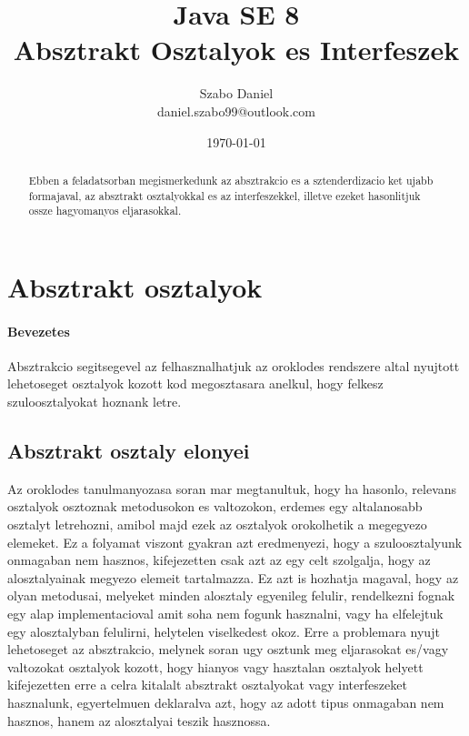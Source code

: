 \documentclass{article}
\title{%
Java SE 8 \\
\large Absztrakt Osztalyok es Interfeszek}
\author{Szabo Daniel\\daniel.szabo99@outlook.com}
\date{\today}
\begin{document}
\maketitle
\begin{abstract}
Ebben a feladatsorban megismerkedunk az absztrakcio es a sztenderdizacio ket ujabb formajaval, az absztrakt osztalyokkal es az interfeszekkel, illetve ezeket hasonlitjuk ossze hagyomanyos eljarasokkal.
\end{abstract}

\newpage

\tableofcontents{}

\newpage

\section{Absztrakt osztalyok}
\paragraph{Bevezetes}

Absztrakcio segitsegevel az felhasznalhatjuk az oroklodes rendszere altal nyujtott lehetoseget osztalyok kozott kod megosztasara anelkul, hogy felkesz szuloosztalyokat hoznank letre.

\subsection{Absztrakt osztaly elonyei}
Az oroklodes tanulmanyozasa soran mar megtanultuk, hogy ha hasonlo, relevans osztalyok osztoznak metodusokon es valtozokon, erdemes egy altalanosabb osztalyt letrehozni, amibol majd ezek az osztalyok orokolhetik a megegyezo elemeket. Ez a folyamat viszont gyakran azt eredmenyezi, hogy a szuloosztalyunk onmagaban nem hasznos, kifejezetten csak azt az egy celt szolgalja, hogy az alosztalyainak megyezo elemeit tartalmazza. Ez azt is hozhatja magaval, hogy az olyan metodusai, melyeket minden alosztaly egyenileg felulir, rendelkezni fognak egy alap implementacioval amit soha nem fogunk hasznalni, vagy ha elfelejtuk egy alosztalyban felulirni, helytelen viselkedest okoz. Erre a problemara nyujt lehetoseget az absztrakcio, melynek soran ugy osztunk meg eljarasokat es/vagy valtozokat osztalyok kozott, hogy hianyos vagy hasztalan osztalyok helyett kifejezetten erre a celra kitalalt absztrakt osztalyokat vagy interfeszeket hasznalunk, egyertelmuen deklaralva azt, hogy az adott tipus onmagaban nem hasznos, hanem az alosztalyai teszik hasznossa.
\end{document}

